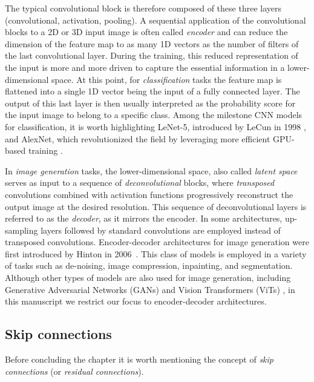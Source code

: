 The typical convolutional block is therefore composed of these three layers (convolutional, activation, pooling). 
A sequential application of the convolutional blocks to a 2D or 3D input image is often called \textit{encoder} and 
can reduce the dimension of the 
feature map to as many 1D vectors as the number of filters of the last convolutional layer. During the training, this 
reduced representation of the input is more and more driven to capture the essential information in a lower-dimensional 
space. At this point, for \textit{classification} tasks the feature map is flattened into a single 1D vector 
being the input of a fully connected layer. The output of this last layer is then usually interpreted as the probability 
score for the input image to belong to a specific class. Among the milestone CNN models for classification, it is worth 
highlighting LeNet-5, introduced by LeCun in 1998 \cite{lecun1998gradient}, and AlexNet, which revolutionized the 
field by leveraging more efficient GPU-based training \cite{krizhevsky2012imagenet}.

In \textit{image generation} tasks, the lower-dimensional space, also called \textit{latent space} serves as input 
to a sequence of 
\textit{deconvolutional} blocks, where \textit{transposed} convolutions combined with activation functions 
progressively reconstruct the output image at the desired resolution. This sequence of deconvolutional layers 
is referred to as the \textit{decoder}, as it mirrors the encoder. In some architectures, up-sampling layers 
followed by standard convolutions are employed instead of transposed convolutions. Encoder-decoder architectures 
for image generation were first introduced by Hinton in 2006~\cite{hinton2006reducing}. This class of models is employed 
in a variety of tasks such as de-noising, image compression, inpainting, 
and segmentation. Although other types of models are also used for image generation, including Generative 
Adversarial Networks (GANs) \cite{goodfellow2014generativeadversarialnetworks} and Vision Transformers 
(ViTs) \cite{dosovitskiy2021imageworth16x16words}, in this manuscript we restrict our focus to 
encoder-decoder architectures.


\subsection{Skip connections}

Before concluding the chapter it is worth mentioning the concept of \textit{skip connections} (or \textit{residual 
connections}). 
